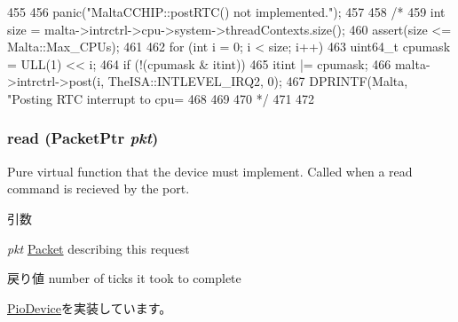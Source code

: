 \begin{DoxyCode}
455 {
456                 panic("MaltaCCHIP::postRTC() not implemented.");
457 
458                 /*
459     int size = malta->intrctrl->cpu->system->threadContexts.size();
460     assert(size <= Malta::Max_CPUs);
461 
462     for (int i = 0; i < size; i++) {
463         uint64_t cpumask = ULL(1) << i;
464        if (!(cpumask & itint)) {
465            itint |= cpumask;
466            malta->intrctrl->post(i, TheISA::INTLEVEL_IRQ2, 0);
467            DPRINTF(Malta, "Posting RTC interrupt to cpu=%
468        }
469     }
470     */
471 
472 }
\end{DoxyCode}
\hypertarget{classMaltaCChip_a613ec7d5e1ec64f8d21fec78ae8e568e}{
\subsubsection[{read}]{ read ({\bf PacketPtr} {\em pkt})}}
\label{classMaltaCChip_a613ec7d5e1ec64f8d21fec78ae8e568e}
Pure virtual function that the device must implement. Called when a read command is recieved by the port. 
\begin{DoxyParams}{引数}
\item[{\em pkt}]\hyperlink{classPacket}{Packet} describing this request \end{DoxyParams}
\begin{DoxyReturn}{戻り値}
number of ticks it took to complete 
\end{DoxyReturn}


\hyperlink{classPioDevice_a842312590432036092c422c87a442358}{PioDevice}を実装しています。


